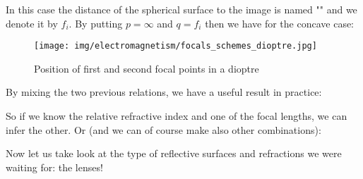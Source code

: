 	In this case the distance of the spherical surface to the image is named "" and we denote it by $f_i$. By putting $p=\infty$ and $q=f_i$ then we have for the concave case:
	
	\begin{figure}[H]
		\centering
		\texttt{[image: img/electromagnetism/focals\_schemes\_dioptre.jpg]}
		\caption{Position of first and second focal points in a dioptre}
	\end{figure}
	By mixing the two previous relations, we have a useful result in practice:
	
	So if we know the relative refractive index and one of the focal lengths, we can infer the other. Or (and we can of course make also other combinations):
	
	Now let us take look at the type of reflective surfaces and refractions we were waiting for: the lenses!
	
